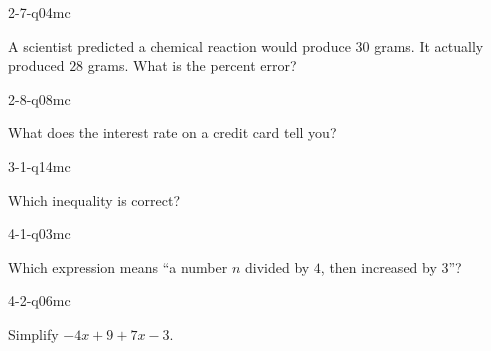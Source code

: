 \begin{practiceQuestion}{2-7-q04}{mc}
\begin{questionText}
A scientist predicted a chemical reaction would produce $30$ grams. It actually produced $28$ grams. What is the percent error?
\end{questionText}
\end{practiceQuestion}

\begin{practiceQuestion}{2-8-q08}{mc}
\begin{questionText}
What does the interest rate on a credit card tell you?
\end{questionText}
\end{practiceQuestion}

\begin{practiceQuestion}{3-1-q14}{mc}
\begin{questionText}
Which inequality is correct?
\end{questionText}
\end{practiceQuestion}

\begin{practiceQuestion}{4-1-q03}{mc}
\begin{questionText}
Which expression means ``a number $n$ divided by $4$, then increased by $3$''?
\end{questionText}
\end{practiceQuestion}

\begin{practiceQuestion}{4-2-q06}{mc}
\begin{questionText}
Simplify $-4x + 9 + 7x - 3$.
\end{questionText}
\end{practiceQuestion}

